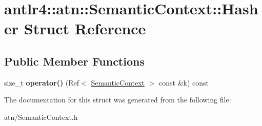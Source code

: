 \hypertarget{structantlr4_1_1atn_1_1SemanticContext_1_1Hasher}{}\section{antlr4\+:\+:atn\+:\+:Semantic\+Context\+:\+:Hasher Struct Reference}
\label{structantlr4_1_1atn_1_1SemanticContext_1_1Hasher}
\subsection*{Public Member Functions}
\begin{DoxyCompactItemize}
\item 
\mbox{\label{structantlr4_1_1atn_1_1SemanticContext_1_1Hasher_a116633ad354037483264ea6361faa278}} 
size\+\_\+t {\bfseries operator()} (Ref$<$ \hyperlink{classantlr4_1_1atn_1_1SemanticContext}{Semantic\+Context} $>$ const \&k) const
\end{DoxyCompactItemize}


The documentation for this struct was generated from the following file\+:\begin{DoxyCompactItemize}
\item 
atn/Semantic\+Context.\+h\end{DoxyCompactItemize}
